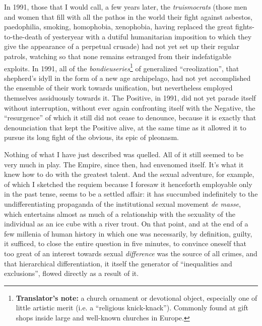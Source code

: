 In 1991, those that I would call, a few years later, the \textit{truismocrats} (those men and women that fill with all the pathos in the world their fight against asbestos, paedophilia, smoking, homophobia, xenophobia, having replaced the great fights-to-the-death of yesteryear with a dutiful humanitarian imposition to which they give the appearance of a perpetual crusade) had not yet set up their regular patrols, watching so that none remains estranged from their indefatigable exploits. In 1991, all of the \textit{bondieuseries}\footnote{\textbf{Translator's note:} a church ornament or devotional object, especially one of little artistic merit (i.e. a ``religious knick-knack''). Commonly found at gift shops inside large and well-known churches in Europe.} of generalized ``creolization'', that shepherd's idyll in the form of a new age archipelago, had not yet accomplished the ensemble of their work towards unification, but nevertheless employed themselves assiduously towards it. The Positive, in 1991, did not yet parade itself without interruption, without ever again confronting itself with the Negative, the ``resurgence'' of which it still did not cease to denounce, because it is exactly that denounciation that kept the Positive alive, at the same time as it allowed it to pursue its long fight of the obvious, its epic of pleonasm.

Nothing of what I have just described was quelled. All of it still seemed to be very much in play. The Empire, since then, had envenomed itself. It's what it knew how to do with the greatest talent. And the sexual adventure, for example, of which I sketched the requiem because I foresaw it henceforth employable only in the past tense, seems to be a settled affair: it has succumbed indefinitely to the undifferentiating propaganda of the institutional sexual movement \textit{de masse}, which entertains almost as much of a relationship with the sexuality of the individual as an ice cube with a river trout. On that point, and at the end of a few millenia of human history in which one was necessarily, by definition, guilty, it sufficed, to close the entire question in five minutes, to convince oneself that too great of an interest towards sexual \textit{difference} was the source of all crimes, and that hierarchical differentiation, it itself the generator of ``inequalities and exclusions'', flowed directly as a result of it.

